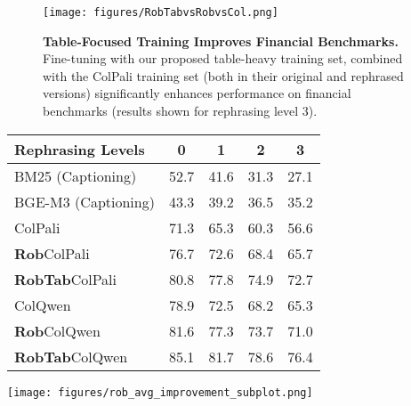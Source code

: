 \vspace{0.1cm}
\begin{figure}[h]
    \centering
    \texttt{[image: figures/RobTabvsRobvsCol.png]} 
    \caption{\textbf{Table-Focused Training Improves Financial Benchmarks.} Fine-tuning with our proposed table-heavy training set, combined with the ColPali training set (both in their original and rephrased versions) significantly enhances performance on financial benchmarks (results shown for rephrasing level 3).}
    \vspace{-0.1cm}
    \label{fig:Table_results_plots} 
\end{figure}

\begin{figure*}[ht]
    \centering
    \begin{minipage}{0.4\textwidth}
        \footnotesize
        \renewcommand{\arraystretch}{1.5} %
        \setlength\tabcolsep{5pt} %

        \vspace{-0.15cm}
        \centering
        \begin{tabular}{lcccc}
            \toprule
            \textbf{Rephrasing Levels} & \textbf{0} & \textbf{1} & \textbf{2} & \textbf{3} \\
            \midrule
            BM25 (Captioning) & 52.7 & 41.6 & 31.3 & 27.1 \\
            BGE-M3 (Captioning) & 43.3 & 39.2 & 36.5 & 35.2 \\
            \addlinespace
            ColPali & 71.3 & 65.3 & 60.3 & 56.6 \\
            \textbf{Rob}ColPali & 76.7 & 72.6 & 68.4 & 65.7 \\
            \textbf{RobTab}ColPali & 80.8 & 77.8 & 74.9 & 72.7 \\
            \addlinespace
            ColQwen & 78.9 & 72.5 & 68.2 & 65.3 \\
            \textbf{Rob}ColQwen & 81.6 & 77.3 & 73.7 & 71.0 \\
            \textbf{RobTab}ColQwen & 85.1 & 81.7 & 78.6 & 76.4 \\
            \bottomrule
        \end{tabular}
        \vspace{-0.05cm}
        \label{Table:average_rephrasing_benchmarks}
    \end{minipage}
    \hfill
    \begin{minipage}{0.58\textwidth}
        \centering
        \texttt{[image: figures/rob\_avg\_improvement\_subplot.png]}
        

\end{minipage}
\end{figure*}
